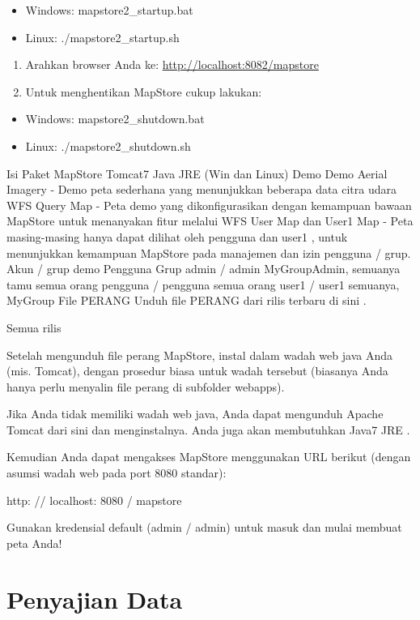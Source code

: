 \documentclass[]{book}
\begin{document}
\begin{itemize}
\item
  Windows: mapstore2\_startup.bat
\item
  Linux: ./mapstore2\_startup.sh
\end{itemize}

\begin{enumerate}
\def\labelenumi{\arabic{enumi}.}
\setcounter{enumi}{1}
\item
  Arahkan browser Anda ke: \url{http://localhost:8082/mapstore}
\item
  Untuk menghentikan MapStore cukup lakukan:
\end{enumerate}

\begin{itemize}
\item
  Windows: mapstore2\_shutdown.bat
\item
  Linux: ./mapstore2\_shutdown.sh
\end{itemize}

Isi Paket
MapStore
Tomcat7
Java JRE (Win dan Linux)
Demo Demo
Aerial Imagery - Demo peta sederhana yang menunjukkan beberapa data citra udara
WFS Query Map - Peta demo yang dikonfigurasikan dengan kemampuan bawaan MapStore untuk menanyakan fitur melalui WFS
User Map dan User1 Map - Peta masing-masing hanya dapat dilihat oleh pengguna dan user1 , untuk menunjukkan kemampuan MapStore pada manajemen dan izin pengguna / grup.
Akun / grup demo
Pengguna Grup
admin / admin MyGroupAdmin, semuanya
tamu semua orang
pengguna / pengguna semua orang
user1 / user1 semuanya, MyGroup
File PERANG
Unduh file PERANG dari rilis terbaru di sini .

Semua rilis

Setelah mengunduh file perang MapStore, instal dalam wadah web java Anda (mis. Tomcat), dengan prosedur biasa untuk wadah tersebut (biasanya Anda hanya perlu menyalin file perang di subfolder webapps).

Jika Anda tidak memiliki wadah web java, Anda dapat mengunduh Apache Tomcat dari sini dan menginstalnya. Anda juga akan membutuhkan Java7 JRE .

Kemudian Anda dapat mengakses MapStore menggunakan URL berikut (dengan asumsi wadah web pada port 8080 standar):

http: // localhost: 8080 / mapstore

Gunakan kredensial default (admin / admin) untuk masuk dan mulai membuat peta Anda!

\hypertarget{penyajian-data}{%
\chapter{Penyajian Data}\label{penyajian-data}}


\end{document}
